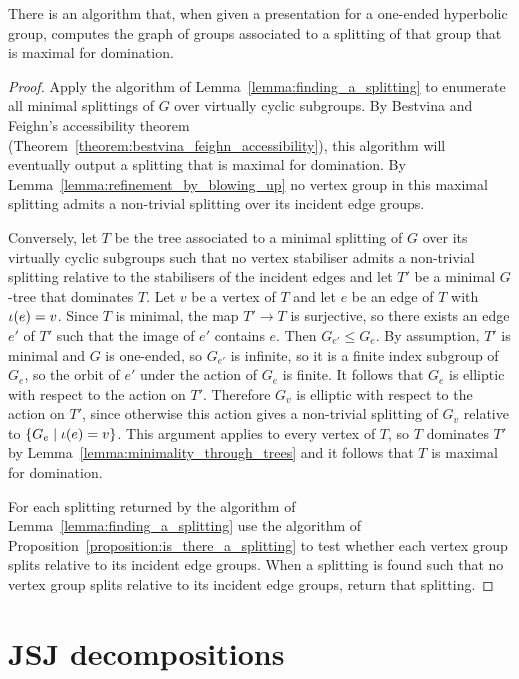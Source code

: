 \begin{proposition}\label{proposition:maximal_splitting_computable} 
  There is an algorithm that, when given a presentation for a one-ended hyperbolic group, computes the graph of groups associated to a splitting of that group that is maximal for domination.
\end{proposition}

\begin{proof}
  Apply the algorithm of Lemma~\ref{lemma:finding_a_splitting} to enumerate all minimal splittings of $G$ over virtually cyclic subgroups.
  By Bestvina and Feighn's accessibility theorem (Theorem~\ref{theorem:bestvina_feighn_accessibility}), this algorithm will eventually output a splitting that is maximal for domination.
  By Lemma~\ref{lemma:refinement_by_blowing_up} no vertex group in this maximal splitting admits a non-trivial splitting over its incident edge groups.

  Conversely, let $T$ be the tree associated to a minimal splitting of $G$ over its virtually cyclic subgroups such that no vertex stabiliser admits a non-trivial splitting relative to the stabilisers of the incident edges and let $T'$ be a minimal $G$-tree that dominates $T$.
  Let $v$ be a vertex of $T$ and let $e$ be an edge of $T$ with $\operatorname{\iota}(e) = v$.
  Since $T$ is minimal, the map $T' \to T$ is surjective, so there exists an edge $e'$ of $T'$ such that the image of $e'$ contains $e$.
  Then $G_{e'} \leq G_e$.
  By assumption, $T'$ is minimal and $G$ is one-ended, so $G_{e'}$ is infinite, so it is a finite index subgroup of $G_e$, so the orbit of $e'$ under the action of $G_e$ is finite.
  It follows that $G_e$ is elliptic with respect to the action on $T'$.
  Therefore $G_v$ is elliptic with respect to the action on $T'$, since otherwise this action gives a non-trivial splitting of $G_v$ relative to $\{G_e \mid \operatorname{\iota}(e) = v\}$.
  This argument applies to every vertex of $T$, so $T$ dominates $T'$ by Lemma~\ref{lemma:minimality_through_trees} and it follows that $T$ is maximal for domination.

  For each splitting returned by the algorithm of Lemma~\ref{lemma:finding_a_splitting} use the algorithm of Proposition~\ref{proposition:is_there_a_splitting} to test whether each vertex group splits relative to its incident edge groups.
  When a splitting is found such that no vertex group splits relative to its incident edge groups, return that splitting.
\end{proof}

\section{JSJ decompositions}\label{section:JSJs_computable}

